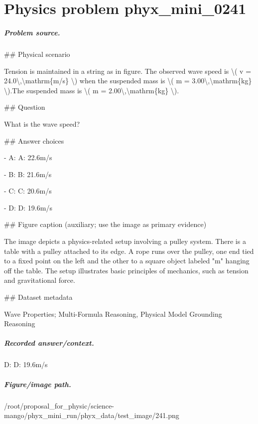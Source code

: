 
\chapter{Physics problem phyx\_mini\_0241}
\label{ch:PhyXMiniProblems_problem_phyx_mini_0241}

\paragraph{Problem source.}
\#\# Physical scenario

Tension is maintained in a string as in figure. The observed wave speed is \textbackslash{}( v = 24.0\textbackslash{},\textbackslash{}mathrm\{m/s\} \textbackslash{}) when the suspended mass is \textbackslash{}( m = 3.00\textbackslash{},\textbackslash{}mathrm\{kg\} \textbackslash{}).The suspended mass is \textbackslash{}( m = 2.00\textbackslash{},\textbackslash{}mathrm\{kg\} \textbackslash{}).

\#\# Question

What is the wave speed?

\#\# Answer choices

- A: A: 22.6m/s

- B: B: 21.6m/s

- C: C: 20.6m/s

- D: D: 19.6m/s

\#\# Figure caption (auxiliary; use the image as primary evidence)

The image depicts a physics-related setup involving a pulley system. There is a table with a pulley attached to its edge. A rope runs over the pulley, one end tied to a fixed point on the left and the other to a square object labeled "m" hanging off the table. The setup illustrates basic principles of mechanics, such as tension and gravitational force.

\#\# Dataset metadata

Wave Properties; Multi-Formula Reasoning, Physical Model Grounding Reasoning

\paragraph{Recorded answer/context.}
D: D: 19.6m/s

\paragraph{Figure/image path.}
/root/proposal\_for\_physic/science-mango/phyx\_mini\_run/phyx\_data/test\_image/241.png

